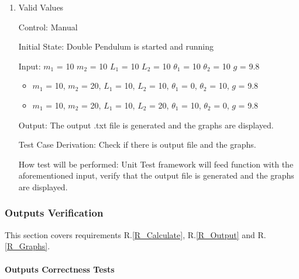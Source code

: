 \documentclass[12pt, titlepage]{article}
\begin{document}
\begin{enumerate}
          
\item{Valid Values}

Control: Manual
          
Initial State: Double Pendulum is started and running
          
Input: $m_1$ = 10 $m_2$ = 10 $L_1$ = 10 $L_2$ = 10 $\theta_1$ = 10 $\theta_2$ =
10 $g$ = 9.8 
\begin{itemize}
\item $m_1$ = 10, $m_2$ = 20, $L_1$ = 10, $L_2$ = 10, $\theta_1$ = 0, $\theta_2$ = 10, $g$ = 9.8
\item $m_1$ = 10, $m_2$ = 20, $L_1$ = 10, $L_2$ = 20, $\theta_1$ = 10, $\theta_2$ = 0, $g$ = 9.8

\end{itemize}

Output: The output .txt file is generated and the graphs are displayed.

Test Case Derivation: Check if there is output file and the graphs.

How test will be performed: Unit Test framework will feed function with the aforementioned input, verify that the output file is generated and the graphs are displayed. 

\end{enumerate}

\subsubsection{Outputs Verification}\label{VRF_Output}

This section covers requirements R.\ref{R_Calculate}, R.\ref{R_Output} and
R.\ref{R_Graphs}.

\paragraph{Outputs Correctness Tests}
\end{document}
